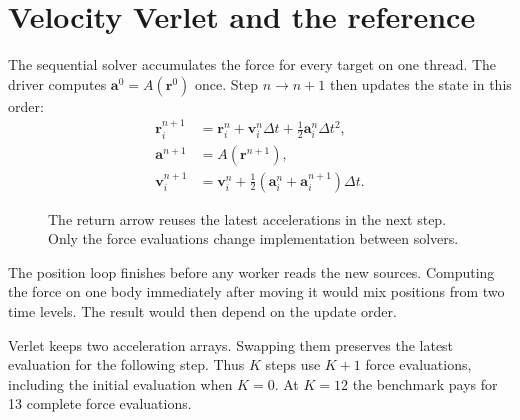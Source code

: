 \documentclass[11pt,a4paper]{article}
\newcommand{\topic}[1]{\clearpage\section*{#1}}
\begin{document}
\topic{Velocity Verlet and the reference}
The sequential solver accumulates the force for every target on one thread.
The driver computes $\mathbf a^0=A(\mathbf r^0)$ once. Step $n\to n+1$ then
updates the state in this order:
\begin{align*}
 \mathbf r_i^{n+1}&=\mathbf r_i^n+\mathbf v_i^n\Delta t+
                               \tfrac12\mathbf a_i^n\Delta t^2,\\
 \mathbf a^{n+1}&=A(\mathbf r^{n+1}),\\
 \mathbf v_i^{n+1}&=\mathbf v_i^n+
                       \tfrac12(\mathbf a_i^n+\mathbf a_i^{n+1})\Delta t .
\end{align*}
\begin{figure}[H]\centering
{}
\caption{The return arrow reuses the latest accelerations in the next step.
Only the force evaluations change implementation between solvers.}
\end{figure}
The position loop finishes before any worker reads the new sources. Computing
the force on one body immediately after moving it would mix positions from
two time levels. The result would then depend on the update order.

Verlet keeps two acceleration arrays. Swapping them preserves the latest
evaluation for the following step. Thus $K$ steps use $K+1$ force evaluations,
including the initial evaluation when $K=0$. At $K=12$ the benchmark pays
for 13 complete force evaluations.
\end{document}
